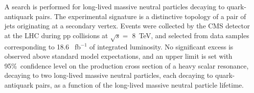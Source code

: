 A search is performed for long-lived massive neutral particles decaying
 to quark-antiquark pairs. The experimental signature is a distinctive topology of a pair of jets originating at a
secondary vertex.
Events were collected by the CMS detector at the LHC during pp collisions at $\sqrt{s}=$ 8~TeV, and selected from data samples corresponding to 18.6 ~fb$^{-1}$ of integrated luminosity. No significant excess
is observed above standard model expectations, and an upper limit is set with 95\%~confidence level on the production
cross section of a heavy scalar resonance, decaying to two long-lived massive neutral particles, each decaying to
quark-antiquark pairs, as a function of the long-lived massive neutral particle
lifetime.
